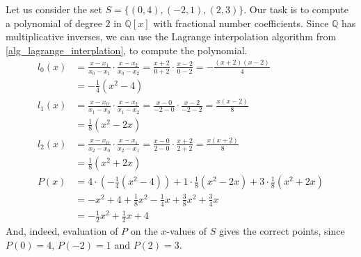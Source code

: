 \begin{example} Let us consider the set $S=\{(0,4),(-2,1),(2,3)\}$. Our task is to compute a polynomial of degree $2$ in $\mathbb{Q}[x]$ with fractional number coefficients. Since $\mathbb{Q}$ has multiplicative inverses, we can use the Lagrange interpolation algorithm from \ref{alg_lagrange_interplation}, to compute the polynomial. 
\begin{align*}
l_0(x) & = \frac{x-x_1}{x_0-x_1}\cdot\frac{x-x_2}{x_0-x_2}
         = \frac{x+2}{0+2}\cdot\frac{x-2}{0-2}
         =  -\frac{(x+2)(x-2)}{4}\\
       & = -\frac{1}{4}(x^2-4)\\
l_1(x) & = \frac{x-x_0}{x_1-x_0}\cdot\frac{x-x_2}{x_1-x_2}
          = \frac{x-0}{-2-0}\cdot \frac{x-2}{-2-2}
          = \frac{x(x-2)}{8}\\
       & = \frac{1}{8}(x^2-2x)\\
l_2(x) & = \frac{x-x_0}{x_2-x_0}\cdot\frac{x-x_1}{x_2-x_1}
          = \frac{x-0}{2-0}\cdot\frac{x+2}{2+2}
          = \frac{x(x+2)}{8}\\
       & = \frac{1}{8}(x^2+2x)\\
P(x)   & =  4\cdot (-\frac{1}{4}(x^2-4)) + 1\cdot \frac{1}{8}(x^2-2x) + 3\cdot \frac{1}{8}(x^2+2x)\\
       & = -x^2+4 + \frac{1}{8}x^2-\frac{1}{4} x + \frac{3}{8}x^2+\frac{3}{4} x \\
       & = -\frac{1}{2} x^2 +\frac{1}{2} x + 4        
\end{align*}
And, indeed, evaluation of $P$ on the $x$-values of $S$ gives the correct points, since $P(0)=4$, $P(-2)=1$ and $P(2)=3$.
\end{example}
